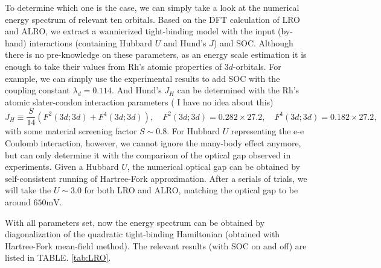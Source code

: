 \documentclass[10pt,nofootinbib,letterpaper]{revtex4}
\begin{document}
		To determine which one is the case, we can simply take a look at the numerical energy spectrum of relevant ten orbitals. Based on the DFT calculation of LRO and ALRO, we extract a wannierized tight-binding model with the input (by-hand) interactions (containing Hubbard $U$ and Hund's $J$) and SOC. Although there is no pre-knowledge on these parameters, as an energy scale estimation it is enough to take their values from $\mathrm{Rh}$'s atomic properties of $3d$-orbitals. For example, we can simply use the experimental results \cite{blume1963theory} to add SOC with the coupling constant $\lambda_d=0.114$. And Hund's $J_H$ can be determined with the $\mathrm{Rh}$'s atomic slater-condon interaction parameters ({\color{red} I have no idea about this}) \cite{slater1929theory}
		\begin{equation*}
			J_H\equiv\dfrac{S}{14}(F^2(3d;3d)+F^4(3d;3d)),\quad F^2(3d;3d)=0.282\times27.2,\quad F^4(3d;3d)=0.182\times27.2,
		\end{equation*}
		with some material screening factor $S\sim0.8$. For Hubbard $U$ representing the e-e Coulomb interaction, however, we cannot ignore the many-body effect anymore, but can only determine it with the comparison of the optical gap observed in experiments. Given a Hubbard $U$, the numerical optical gap can be obtained by self-consistent running of Hartree-Fork approximation. After a serials of trials, we will take the $U\sim3.0$ for both LRO and ALRO, matching the optical gap to be around $650\mathrm{mV}$.\par
		With all parameters set, now the energy spectrum can be obtained by diagonalization of the quadratic tight-binding Hamiltonian (obtained with Hartree-Fork mean-field method). The relevant results (with SOC on and off) are listed in TABLE. \ref{tab:LRO}.\par
\end{document}
